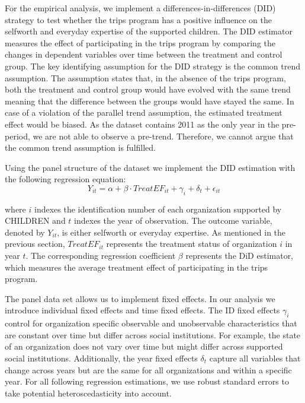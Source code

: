 \documentclass[12pt, a4paper, titlepage]{article}\usepackage[]{graphicx}\usepackage[]{color}
\begin{document}
For the empirical analysis, we implement a differences-in-differences (DID) strategy to test whether the trips program has a positive influence on the selfworth and everyday expertise of the supported children. The DID estimator measures the effect of participating in the trips program by comparing the changes in dependent variables over time between the treatment and control group. The key identifying assumption for the DID strategy is the common trend assumption. The assumption states that, in the absence of the trips program, both the treatment and control group would have evolved with the same trend meaning that the difference between the groups would have stayed the same. In case of a violation of the parallel trend assumption, the estimated treatment effect would be biased. As the dataset contains 2011 as the only year in the pre-period, we are not able to observe a pre-trend. Therefore, we cannot argue that the common trend assumption is fulfilled.

Using the panel structure of the dataset we implement the DID estimation with the following regression equation:
\begin{equation}
\label{didregression}
  Y_{it} = \alpha + \beta \cdot TreatEF_{it} + \gamma_{i} + \delta_{t} + \epsilon_{it}
\end{equation}

where $i$ indexes the identification number of each organization supported by CHILDREN and $t$ indexes the year of observation. The outcome variable, denoted by $Y_{it}$, is either selfworth or everyday expertise. As mentioned in the previous section, $TreatEF_{it}$ represents the treatment status of organization $i$ in year $t$. The corresponding regression coefficient $\beta$ represents the DiD estimator, which measures the average treatment effect of participating in the trips program.

The panel data set allows us to implement fixed effects. In our analysis we introduce individual fixed effects and time fixed effects. The ID fixed effects $\gamma_{i}$ control for organization specific observable and unobservable characteristics that are constant over time but differ across social institutions. For example, the state of an organization does not vary over time but might differ across supported social institutions. Additionally, the year fixed effects $\delta_{t}$ capture all variables that change across years but are the same for all organizations and within a specific year. For all following regression estimations, we use robust standard errors to take potential heteroscedasticity into account.
\end{document}
